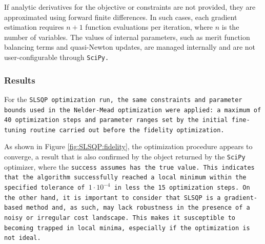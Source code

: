 If analytic derivatives for the objective or constraints are not provided, they are approximated using forward finite differences. 
In such cases, each gradient estimation requires $n+1$ function evaluations per iteration, where $n$ is the number of variables.
The values of internal parameters, such as merit function balancing terms and quasi-Newton updates, are managed internally and are not user-configurable through \tt{SciPy}.

\subsubsection{Results}
For the \tt{SLSQP} optimization run, the same constraints and parameter bounds used in the Nelder-Mead optimization were applied: a maximum of 40 optimization steps and parameter ranges set by the initial fine-tuning routine carried out before the fidelity optimization.

As shown in Figure \ref{fig:SLSQP:fidelity}, the optimization procedure appears to converge, a result that is also confirmed by the object returned by the \texttt{SciPy} optimizer, where the \tt{success} assumes has the \tt{true} value.
This indicates that the algorithm successfully reached a local minimum within the specified tolerance of $1\cdot10^{-4}$ in less the 15 optimization steps. On the other hand, it is important to consider that SLSQP is a gradient-based method and, as such, may lack robustness in the presence of a noisy or irregular cost landscape.
This makes it susceptible to becoming trapped in local minima, especially if the optimization is not ideal.

